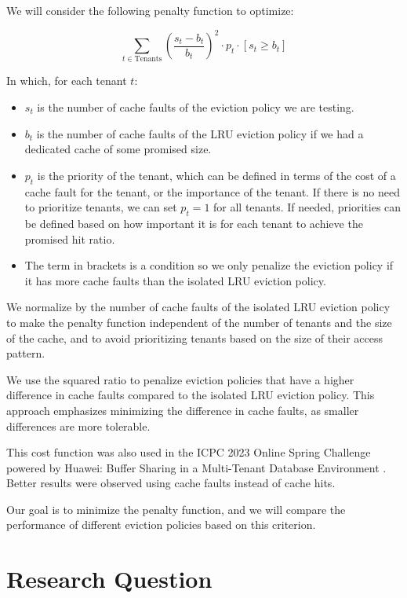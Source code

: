 We will consider the following penalty function to optimize:

$$
\sum_{t \in \text{Tenants}} \left( \frac{s_t - b_t}{b_t} \right) ^2 \cdot p_t \cdot \left[s_t \geq b_t\right]
$$

In which, for each tenant $t$:
\begin{itemize}
  \item $s_t$ is the number of cache faults of the eviction policy we are testing.
  \item $b_t$ is the number of cache faults of the LRU eviction policy if we had a dedicated 
  cache of some promised size.
  \item $p_t$ is the priority of the tenant, which can be defined in terms of the cost of a cache 
  fault for the tenant, or the importance of the tenant. If there is no need to prioritize 
  tenants, we can set $p_t = 1$ for all tenants. If needed, priorities can be defined based on 
  how important it is for each tenant to achieve the promised hit ratio.
  \item The term in brackets is a condition so we only penalize the eviction policy if it has 
  more cache faults than the isolated LRU eviction policy.
\end{itemize}

We normalize by the number of cache faults of the isolated LRU eviction policy to make the 
penalty function independent of the number of tenants and the size of the cache, and to avoid 
prioritizing tenants based on the size of their access pattern.

We use the squared ratio to penalize eviction policies that have a higher difference in cache 
faults compared to the isolated LRU eviction policy. This approach emphasizes minimizing the 
difference in cache faults, as smaller differences are more tolerable.

This cost function was also used in the ICPC 2023 Online Spring Challenge powered by Huawei: 
Buffer Sharing in a Multi-Tenant Database Environment \cite{huawei-challenge}. Better results 
were observed using cache faults instead of cache hits.

Our goal is to minimize the penalty function, and we will compare the performance of different 
eviction policies based on this criterion.

\section{Research Question}

